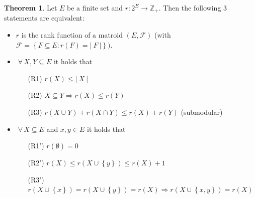 \documentclass[a4paper]{article}
\theoremstyle{definition}
\newtheorem{theorem}{Theorem}
\newcommand{\card}[1]{\left|\:\!#1\:\!\right|}
\newcommand{\set}[1]{\left\{#1\right\}}
\newcommand{\fall}{\;\forall\,}
\begin{document}
\begin{theorem}
  \label{satz-8.6}
  Let $E$ be a finite set and $r: 2^E \rightarrow \mathbb{Z}_+$. Then the following 3 statements are equivalent:
  \begin{itemize}
    \item $r$ is the rank function of a matroid $(E, \mathcal{F})$ (with $\mathcal{F} = \set{F \subseteq E: r(F) = \card{F}})$.
    \item $\fall X, Y \subseteq E$ it holds that
      \begin{itemize}
        \item[(R1)] $r(X) \leq \card{X}$
        \item[(R2)] $X \subseteq Y \Rightarrow r(X) \leq r(Y)$
        \item[(R3)] $r(X \cup Y) + r(X \cap Y) \leq r(X) + r(Y)$ (submodular)
      \end{itemize}
    \item $\fall X \subseteq E$ and $x, y \in E$ it holds that
      \begin{itemize}
        \item[(R1')] $r(\emptyset) = 0$
        \item[(R2')] $r(X) \leq r(X \cup \set{y}) \leq r(X) + 1$
        \item[(R3')] $r(X \cup \set{x}) = r(X \cup \set{y}) = r(X) \Rightarrow r(X \cup \set{x, y}) = r(X)$
      \end{itemize}
  \end{itemize}
\end{theorem}
\end{document}
